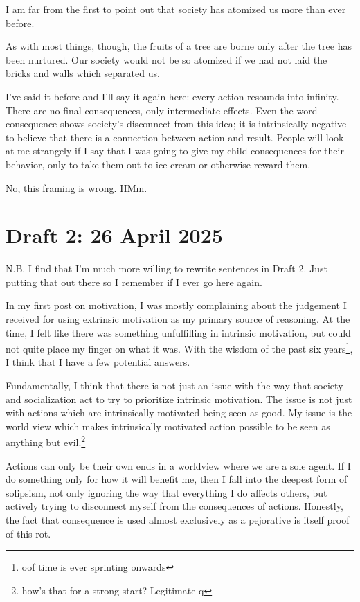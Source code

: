 \documentclass[12pt]{article}
\renewcommand{\,}{\textsuperscript{,}}
\begin{document}
I am far from the first to point out that society has atomized us more than ever before.

As with most things, though, the fruits of a tree are borne only after the tree has been nurtured.  
Our society would not be so atomized if we had not laid the bricks and walls which separated us.

I've said it before and I'll say it again here: every action resounds into infinity.  
There are no final consequences, only intermediate effects.  
Even the word consequence shows society's disconnect from this idea; it is intrinsically negative to believe that there is a connection between action and result.  
People will look at me strangely if I say that I was going to give my child consequences for their behavior, only to take them out to ice cream or otherwise reward them.

No, this framing is wrong.  
HMm.

\section{Draft 2: 26 April 2025}

N.B. I find that I'm much more willing to rewrite sentences in Draft 2. Just putting that out there so I remember if I ever go here again.

In my first post \href{motivation}{on motivation}, I was mostly complaining about the judgement I received for using extrinsic motivation as my primary source of reasoning.  
At the time, I felt like there was something unfulfilling in intrinsic motivation, but could not quite place my finger on what it was.  
With the wisdom of the past six years\footnote{oof time is ever sprinting onwards}, I think that I have a few potential answers.

Fundamentally, I think that there is not just an issue with the way that society and socialization act to try to prioritize intrinsic motivation.  
The issue is not just with actions which are intrinsically motivated being seen as good.  
My issue is the world view which makes intrinsically motivated action possible to be seen as anything but evil.\footnote{how's that for a strong start? Legitimate q}

Actions can only be their own ends in a worldview where we are a sole agent.  
If I do something only for how it will benefit me, then I fall into the deepest form of solipsism, not only ignoring the way that everything I do affects others, but actively trying to disconnect myself from the consequences of actions.  
Honestly, the fact that consequence is used almost exclusively as a pejorative is itself proof of this rot.
\end{document}
